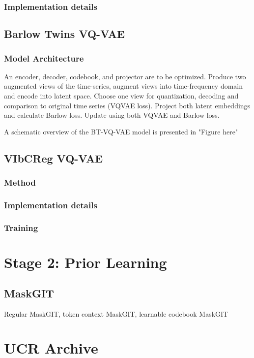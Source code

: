 \documentclass[../../thesis.tex]{subfiles}
\begin{document}
\subsubsection{Implementation details}

\subsection{Barlow Twins VQ-VAE}
\subsubsection{Model Architecture}


An encoder, decoder, codebook, and projector are to be optimized. Produce two augmented views of the time-series, augment views into time-frequency domain and encode into latent space. Choose one view for quantization, decoding and comparison to original time series (VQVAE loss). Project both latent embeddings and calculate Barlow loss. Update using both VQVAE and Barlow loss.

A schematic overview of the BT-VQ-VAE model is presented in "Figure here"



\subsection{VIbCReg VQ-VAE}

\subsubsection{Method}

\subsubsection{Implementation details}

\subsubsection{Training}

\section{Stage 2: Prior Learning}

\subsection{MaskGIT}
Regular MaskGIT, token context MaskGIT, learnable codebook MaskGIT


\section{UCR Archive}
\end{document}
